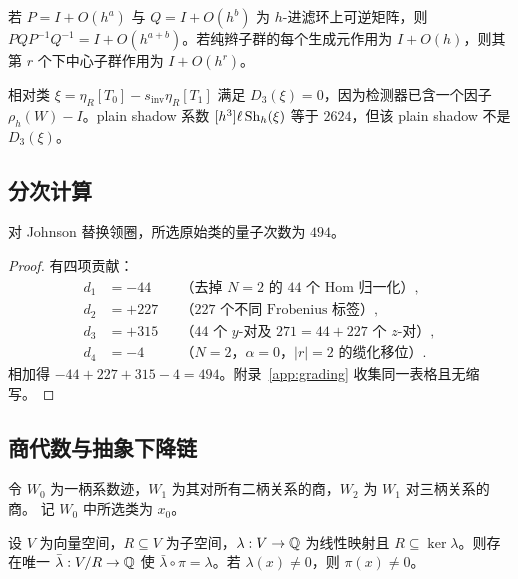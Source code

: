 \begin{lemma}[交换子阶]\label{lem:commutator-order}
若 $P=I+O(h^a)$ 与 $Q=I+O(h^b)$ 为 $h$-进滤环上可逆矩阵，则
$PQP^{-1}Q^{-1}=I+O(h^{a+b})$。若纯辫子群的每个生成元作用为 $I+O(h)$，则其第
$r$ 个下中心子群作用为 $I+O(h^r)$。
\end{lemma}

\begin{remark}[相对类]\label{rem:vT-xi}
相对类 $\xi=\eta_R[T_0]-s_{\mathrm{inv}}\eta_R[T_1]$ 满足 $D_3(\xi)=0$，因为检测器已含一个因子
$\rho_h(W)-I$。plain shadow 系数 $[h^3]\ell\operatorname{Sh}_h(\xi)$ 等于 $2624$，但该 plain shadow
不是 $D_3(\xi)$。
\end{remark}

\subsection{分次计算}

\begin{proposition}[量子次数]\label{prop:degree-494}
对 Johnson 替换领圈，所选原始类的量子次数为 $494$。
\end{proposition}

\begin{proof}
有四项贡献：
\begin{align}
d_1&=-44 &&\text{（去掉 $N=2$ 的 $44$ 个 Hom 归一化）},\\
d_2&=+227 &&\text{（$227$ 个不同 Frobenius 标签）},\\
d_3&=+315 &&\text{（$44$ 个 $y$-对及 $271=44+227$ 个 $z$-对）},\\
d_4&=-4 &&\text{（$N=2$，$\alpha=0$，$|r|=2$ 的缆化移位）}.
\end{align}
相加得 $-44+227+315-4=494$。附录~\ref{app:grading} 收集同一表格且无缩写。
\end{proof}

\subsection{商代数与抽象下降链}

令 $W_0$ 为一柄系数迹，$W_1$ 为其对所有二柄关系的商，$W_2$ 为 $W_1$ 对三柄关系的商。
记 $W_0$ 中所选类为 $x_0$。

\begin{lemma}[线性检测器在商中存活]\label{lem:quotient-detector}
设 $V$ 为向量空间，$R\subseteq V$ 为子空间，$\lambda:V\to\mathbb{Q}$ 为线性映射且
$R\subseteq\ker\lambda$。则存在唯一 $\bar\lambda:V/R\to\mathbb{Q}$ 使
$\bar\lambda\circ\pi=\lambda$。若 $\lambda(x)\ne0$，则 $\pi(x)\ne0$。
\end{lemma}

